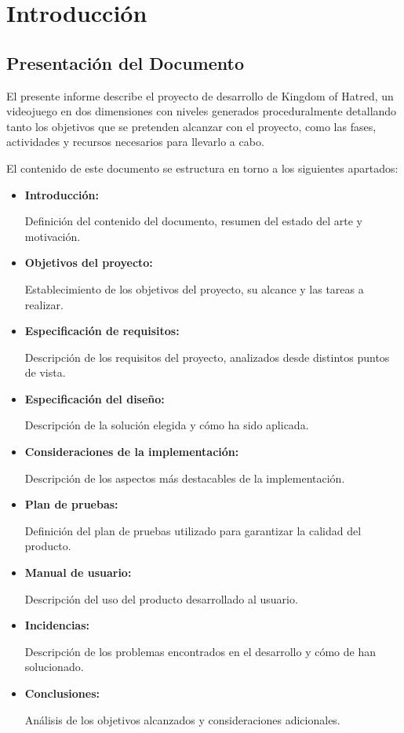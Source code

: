 \chapter{Introducción}\label{cha:introduccion}

	\section{Presentación del Documento}

		El presente informe describe el proyecto de desarrollo de Kingdom of Hatred, un videojuego en dos dimensiones con niveles generados proceduralmente detallando tanto los objetivos que se pretenden alcanzar con el proyecto, como las fases, actividades y recursos necesarios para llevarlo a cabo.

		El contenido de este documento se estructura en torno a los siguientes apartados:

		\begin{itemize}
			\item \textbf{Introducción:}
				
			Definición del contenido del documento, resumen del estado del arte y motivación.
			
			\item \textbf{Objetivos del proyecto:}
				
			Establecimiento de los objetivos del proyecto, su alcance y las tareas a realizar.
			
			\item \textbf{Especificación de requisitos:}

			Descripción de los requisitos del proyecto, analizados desde distintos puntos de vista.

			\item \textbf{Especificación del diseño:}
			
			Descripción de la solución elegida y cómo ha sido aplicada.

			\item \textbf{Consideraciones de la implementación:}

			Descripción de los aspectos más destacables de la implementación.

			\item \textbf{Plan de pruebas:}

			Definición del plan de pruebas utilizado para garantizar la calidad del producto.

			\item \textbf{Manual de usuario:}

			Descripción del uso del producto desarrollado al usuario.

			\item \textbf{Incidencias:}

			Descripción de los problemas encontrados en el desarrollo y cómo de han solucionado.

			\item \textbf{Conclusiones:}

			Análisis de los objetivos alcanzados y consideraciones adicionales.
		\end{itemize}

